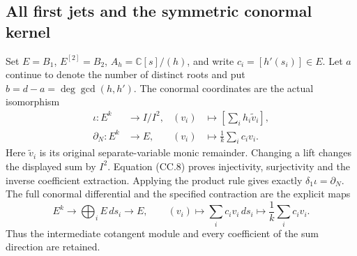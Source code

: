 \subsection{All first jets and the symmetric conormal kernel}

Set \(E=B_1\), \(E^{[2]}=B_2\), \(A_h=\mathbb C[s]/(h)\),
and write \(c_i=[h'(s_i)]\in E\).  Let
\(a\) continue to denote the number of distinct roots and put
\(b=d-a=\deg\gcd(h,h')\).
The conormal coordinates are the actual isomorphism
\[
 \begin{aligned}
 \iota:E^k&\longrightarrow I/I^2,&
 (v_i)&\longmapsto\left[\sum_i h_i\widetilde v_i\right],\\
 \partial_N:E^k&\longrightarrow E,&
 (v_i)&\longmapsto\frac1k\sum_i c_iv_i .
 \end{aligned}\tag{CC.29}
\]
Here \(\widetilde v_i\) is its original separate-variable monic
remainder.  Changing a lift changes the displayed sum by \(I^2\).
Equation (CC.8) proves injectivity, surjectivity and the inverse
coefficient extraction.  Applying the product rule gives exactly
\(\delta_1\iota=\partial_N\).
The full conormal differential and the specified contraction are
the explicit maps
\[
 E^k\longrightarrow\bigoplus_i E\,ds_i\longrightarrow E,
 \qquad (v_i)\longmapsto\sum_i c_iv_i\,ds_i
       \longmapsto\frac1k\sum_i c_iv_i.
 \tag{CC.30}
\]
Thus the intermediate cotangent module and every coefficient of the
sum direction are retained.

